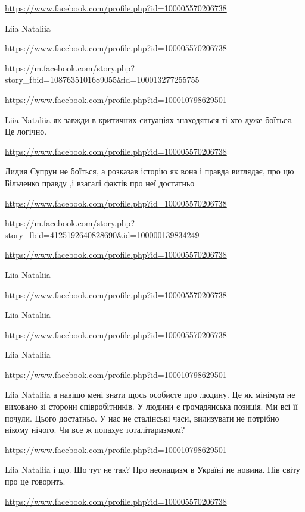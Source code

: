 \documentclass[a4paper,11pt]{extreport}
\begin{document}
\begin{itemize}
\begin{itemize}
\end{itemize}
\url{https://www.facebook.com/profile.php?id=100005570206738}

Liia Nataliia

\url{https://www.facebook.com/profile.php?id=100005570206738}

https://m.facebook.com/story.php?story_fbid=1087635101689055&id=100013277255755

\begin{itemize}
\url{https://www.facebook.com/profile.php?id=100010798629501}

Liia Nataliia як завжди в критичних ситуаціях знаходяться ті хто дуже боїться. Це логічно.

\url{https://www.facebook.com/profile.php?id=100005570206738}

Лидия Супрун не боїться, а розказав історію як вона і правда виглядає, про цю Більченко правду ,і взагалі фактів про неї достатньо

\url{https://www.facebook.com/profile.php?id=100005570206738}

https://m.facebook.com/story.php?story_fbid=4125192640828690&id=100000139834249

\url{https://www.facebook.com/profile.php?id=100005570206738}

Liia Nataliia

\url{https://www.facebook.com/profile.php?id=100005570206738}

Liia Nataliia

\url{https://www.facebook.com/profile.php?id=100005570206738}

Liia Nataliia

\url{https://www.facebook.com/profile.php?id=100010798629501}

Liia Nataliia а навіщо мені знати щось особисте про людину. Це як мінімум не виховано зі сторони співробітників.
У людини є громадянська позиція. Ми всі її почули. Цього достатньо.
У нас не сталінські часи, вилизувати не потрібно нікому нічого. Чи все ж попахує тоталітаризмом?

\url{https://www.facebook.com/profile.php?id=100010798629501}

Liia Nataliia і що. Що тут не так?
Про неонацизм в Україні не новина. Пів світу про це говорить.

\url{https://www.facebook.com/profile.php?id=100005570206738}


\end{itemize}
\end{itemize}
\end{document}
